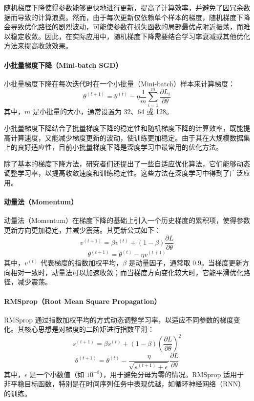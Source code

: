 随机梯度下降使得参数能够更快地进行更新，提高了计算效率，并避免了因冗余数据而导致的计算浪费。然而，由于每次更新仅依赖单个样本的梯度，随机梯度下降 会导致优化路径的剧烈波动，可能使参数在损失函数的局部最优点附近振荡，而难以稳定收敛。因此，在实际应用中，随机梯度下降需要结合学习率衰减或其他优化方法来提高收敛效果。

\paragraph*{小批量梯度下降（Mini-batch SGD）}
小批量梯度下降在每次迭代时在一个小批量（Mini-batch）样本来计算梯度：
\begin{equation}
\theta^{(t+1)} = \theta^{(t)} - \eta \frac{1}{m} \sum_{i=1}^{m} \frac{\partial L_i}{\partial \theta}
\end{equation}
其中，\(m\) 是小批量的大小，通常设置为 32、64 或 128。

小批量梯度下降结合了批量梯度下降的稳定性和随机梯度下降的计算效率，既能提高计算速度，又能减少梯度更新的波动，使训练更加稳定。由于其在大规模数据集上的良好适应性，目前小批量梯度下降是深度学习中最常用的优化方法。

除了基本的梯度下降方法，研究者们还提出了一些自适应优化算法，它们能够动态调整学习率，以提高收敛速度和训练稳定性。这些方法在深度学习中得到了广泛应用。

\paragraph*{动量法（Momentum）}
动量法（Momentum）在梯度下降的基础上引入一个历史梯度的累积项，使得参数更新方向更加稳定，并减少震荡。其更新公式如下：
\begin{equation}
v^{(t+1)} = \beta v^{(t)} + (1-\beta) \frac{\partial L}{\partial \theta}
\end{equation}
\begin{equation}
\theta^{(t+1)} = \theta^{(t)} - \eta v^{(t+1)}
\end{equation}
其中，\( v^{(t)} \) 代表梯度的指数加权平均，\( \beta \) 是动量因子，通常取 \( 0.9 \)。当梯度更新方向相对一致时，动量法可以加速收敛；而当梯度方向变化较大时，它能平滑优化路径，减少震荡。

\paragraph*{RMSprop（Root Mean Square Propagation）}
RMSprop 通过指数加权平均的方式动态调整学习率，以适应不同参数的梯度变化。其核心思想是对梯度的二阶矩进行指数平滑：
\begin{equation}
s^{(t+1)} = \beta s^{(t)} + (1-\beta) \left(\frac{\partial L}{\partial \theta} \right)^2
\end{equation}
\begin{equation}
\theta^{(t+1)} = \theta^{(t)} - \frac{\eta}{\sqrt{s^{(t+1)} + \epsilon}} \frac{\partial L}{\partial \theta}
\end{equation}
其中，\( \epsilon \) 是一个小数值（如 \(10^{-8}\)），用于避免分母为零的情况。RMSprop 适用于非平稳目标函数，特别是在时间序列任务中表现优越，如循环神经网络（RNN）的训练。

